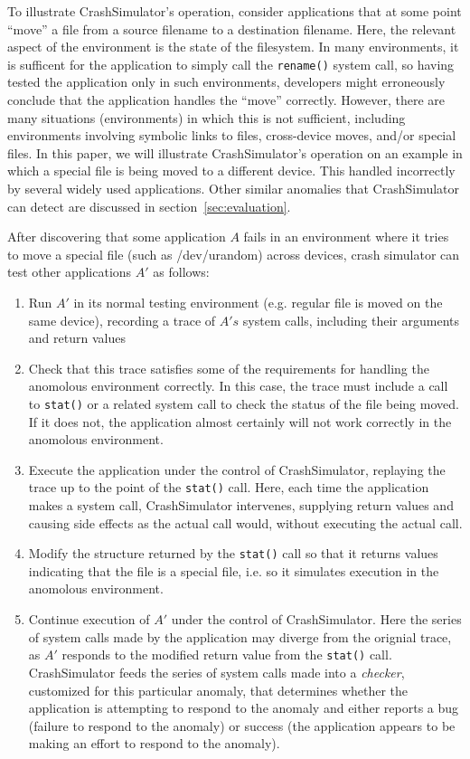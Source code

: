 To illustrate CrashSimulator's operation, consider applications that
at some point ``move'' a file from a source filename to a destination filename.
Here, the relevant aspect of the environment is the state of the filesystem.
In many environments, it is sufficent for the application to simply call the {\tt rename()} system call, so having tested
the application only in such environments, developers might erroneously conclude that the application handles the ``move'' correctly.
However, there are many situations (environments) in which this is not sufficient, including environments involving symbolic links to files,
cross-device moves, and/or special files.
In this paper, we will illustrate CrashSimulator's operation on an example in which a special file is being moved to a different device.
This handled incorrectly by several widely used applications. Other similar anomalies that CrashSimulator can detect are discussed in section~\ref{sec:evaluation}.

After discovering that some application $A$ fails in an environment where it tries to move a special file (such as /dev/urandom) across
devices, crash simulator can test other applications $A'$ as follows:
\begin{enumerate}
	\item
		Run $A'$ in its normal testing environment (e.g. regular file is moved on the same device), recording a trace of $A's$ system calls, including their arguments and return values
	\item
		Check that this trace satisfies some of the requirements for handling the anomolous environment correctly. In this case, the trace must include a call to {\tt stat()} or a related system call to check the status of the file being moved. If it does not, the application almost certainly will not work correctly in the anomolous environment.
	\item Execute the application under the control of CrashSimulator, replaying the trace up to the point of the {\tt stat()} call. Here, each time the application makes a system call, CrashSimulator intervenes, supplying return values and causing side effects as the actual call would, without executing the actual call.
	\item
		Modify the structure returned by the {\tt stat()} call so that it returns values indicating that the file is a special file, i.e. so it simulates execution in the anomolous environment.
	\item
		Continue execution of $A'$ under the control of CrashSimulator. Here the series of system calls made by
                the application may diverge from the orignial trace, as $A'$ responds to the modified return value from
                the {\tt stat()} call. CrashSimulator feeds the series of system calls made into a {\em checker},
                customized for this particular anomaly, that determines whether the application is attempting to respond
                to the anomaly and either reports a bug (failure to respond to the anomaly) or success (the application
                appears to be making an effort to respond to the anomaly).
\end{enumerate}

